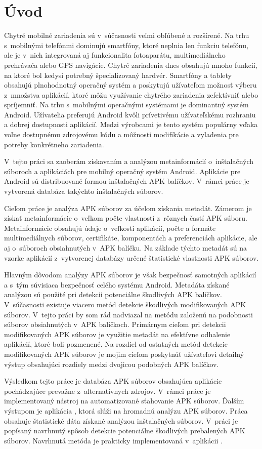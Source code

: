 \chapter{Úvod}
Chytré mobilné zariadenia sú v~súčasnosti veľmi obľúbené a rozšírené. Na trhu s~mobilnými telefónmi dominujú smartfóny, ktoré neplnia len funkciu telefónu, ale je v~nich integrovaná aj funkcionalita fotoaparátu, multimediálneho prehrávača alebo GPS navigácie. Chytré zariadenia dnes obsahujú mnoho funkcií, na ktoré bol kedysi potrebný špecializovaný hardvér. Smartfóny a tablety obsahujú plnohodnotný operačný systém a poskytujú užívateľom možnosť výberu z~množstva aplikácií, ktoré môžu využívanie chytrého zariadenia zefektívniť alebo spríjemniť. Na trhu s~mobilnými operačnými systémami je dominantný systém Android. Užívatelia preferujú Android kvôli prívetivému užívateľskému rozhraniu a dobrej dostupnosti aplikácií. Medzi výrobcami je tento systém populárny vďaka voľne dostupnému zdrojovému kódu a môžnosti modifikácie a vyladenia pre potreby konkrétneho zariadenia.

V~tejto práci sa zaoberám získavaním a analýzou metainformácií o~inštalačných súboroch a aplikáciách pre mobilný operačný systém Android. Aplikácie pre Android sú distribuované formou inštalačných APK balíčkov. V~rámci práce je vytvorená databáza takýchto inštalačných súborov. 

Cieľom práce je analýza APK súborov za účelom získania metadát. Zámerom je získať metainformácie o~veľkom počte vlastností z~rôznych častí APK súboru. Metainformácie obsahujú údaje o~veľkosti aplikácií, počte a formáte multimediálnych súborov, certifikáte, komponentách a preferenciách aplikácie, ale aj o~súboroch obsiahnutých v~APK balíčku. Na základe týchto metadát sú na vzorke aplikácií z~vytvorenej databázy určené štatistické vlastnosti APK súborov. 

Hlavným dôvodom analýzy APK súborov je však bezpečnosť samotných aplikácií a s~tým súvisiaca bezpečnosť celého systému Android. Metadáta získané analýzou sú použité pri detekcii potenciálne škodlivých APK balíčkov.
V~súčasnosti existuje viacero metód detekcie škodlivých modifikovaných APK  súborov. V~tejto práci by som rád nadviazal na metódu založenú na podobnosti súborov obsiahnutých v~APK balíčkoch.
Primárnym cieľom pri detekcii modifikovaných APK súborov je využitie metadát na efektívne odhalenie aplikácií, ktoré boli pozmenené. Na rozdiel od ostatných metód detekcie modifikovaných APK súborov je mojim cieľom poskytnúť užívateľovi detailný výstup obsahujúci rozdiely medzi dvojicou podobných APK balíčkov.

Výsledkom tejto práce je databáza APK súborov obsahujúca aplikácie pochádzajúce prevažne z~alternatívnych zdrojov. V~rámci práce je implementovaný nástroj na automatizované sťahovanie APK súborov. Ďalším výstupom je aplikácia , ktorá slúži na hromadnú analýzu APK súborov. Práca obsahuje štatistické dáta získané analýzou inštalačných súborov. V~práci je popísaný navrhnutý spôsob detekcie potenciálne škodlivých prebalených APK súborov. Navrhnutá metóda je prakticky implementovaná v~aplikácii .